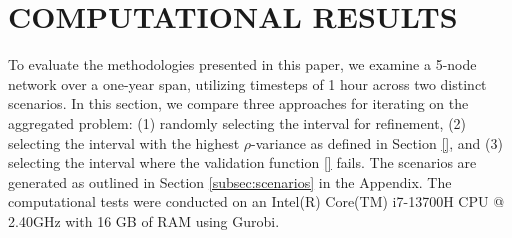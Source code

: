 \section{COMPUTATIONAL RESULTS}\label{section: comp res}
{
\color{purple}

To evaluate the methodologies presented in this paper, we examine a  5-node network over a one-year span, utilizing timesteps of 1 hour across two distinct scenarios.
 In this section, we compare three approaches for iterating on the aggregated problem: (1) randomly selecting the interval for refinement, 
 (2) selecting the interval with the highest \(\rho\)-variance as defined in Section \ref{}, and (3) selecting the interval where the validation function \ref{} fails. 
 The scenarios are generated as outlined in Section \ref{subsec:scenarios} in the Appendix. 
 The computational tests were conducted on an Intel(R) Core(TM) i7-13700H CPU @ 2.40GHz with 16 GB of RAM using Gurobi.

}
